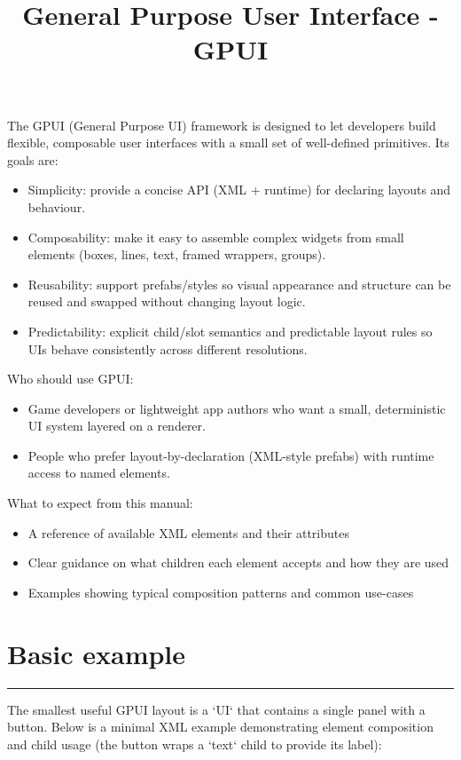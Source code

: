 \documentclass[a4paper,11pt]{article}
\begin{document}
\title{General Purpose User Interface - GPUI}
\maketitle
The GPUI (General Purpose UI) framework is designed to let developers build flexible, composable user interfaces with a small set of well-defined primitives. Its goals are:

\begin{itemize}
    \item Simplicity: provide a concise API (XML + runtime) for declaring layouts and behaviour.
    \item Composability: make it easy to assemble complex widgets from small elements (boxes, lines, text, framed wrappers, groups).
    \item Reusability: support prefabs/styles so visual appearance and structure can be reused and swapped without changing layout logic.
    \item Predictability: explicit child/slot semantics and predictable layout rules so UIs behave consistently across different resolutions.
\end{itemize}
Who should use GPUI:

\begin{itemize}
    \item Game developers or lightweight app authors who want a small, deterministic UI system layered on a renderer.
    \item People who prefer layout-by-declaration (XML-style prefabs) with runtime access to named elements.
\end{itemize}
What to expect from this manual:

\begin{itemize}
    \item A reference of available XML elements and their attributes
    \item Clear guidance on what children each element accepts and how they are used
    \item Examples showing typical composition patterns and common use-cases
\end{itemize}

\section*{Basic example}
\vspace{-1.2em}
\rule{\linewidth}{0.4pt}
The smallest useful GPUI layout is a `UI` that contains a single panel with a button. Below is a minimal XML example demonstrating element composition and child usage (the button wraps a `text` child to provide its label):
\end{document}

